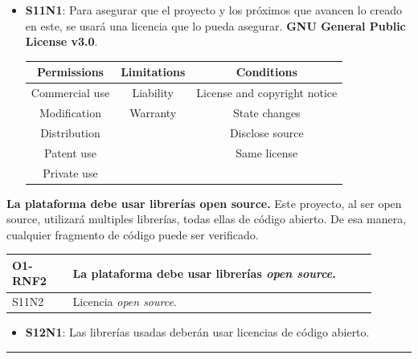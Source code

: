 \begin{itemize}
    \item \textbf{S11N1}: Para asegurar que el proyecto y los próximos que avancen lo creado en este, se usará una licencia que lo pueda asegurar. \textbf{GNU General Public License v3.0}.
    \begin{table}[h!]
        \centering
        \begin{tabular}{|c|c|c|}
            \hline
            Permissions         & Limitations   & Conditions \\
            \hline
            Commercial use      & Liability     & License and copyright notice \\
            \hline
            Modification        & Warranty      & State changes \\
            \hline
            Distribution        &               & Disclose source\\
            \hline
            Patent use          &               & Same license \\
            \hline
            Private use         &               & \\
            \hline
        \end{tabular}
        \cite{web:LICENSE}
    \end{table}
\end{itemize}
\textbf{La plataforma debe usar librerías open source.}
Este proyecto, al ser open source, utilizará multiples librerías, todas ellas de código abierto. De esa manera, cualquier fragmento de código puede ser verificado.
\begin{center}
    \begin{table}[h!]
        \begin{tabular}{|p{0.15\linewidth} | p{0.75\linewidth}|}
            \hline
            \rowcolor{Gray} 
            \textbf{O1-RNF2} & \textbf{La plataforma debe usar librerías \textit{open source}.} \\
            \hline
            S11N2            & Licencia \textit{open source}. \\
            \hline
        \end{tabular}
    \end{table}
\end{center}
\begin{itemize}
    \item \textbf{S12N1}: Las librerías usadas deberán usar licencias de código abierto.
\end{itemize}
\noindent\rule{\textwidth}{0.4pt}
